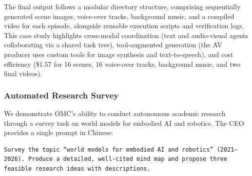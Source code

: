 \documentclass[11pt,a4paper]{article}
\begin{document}
The final output follows a modular directory structure, comprising sequentially generated scene images, voice-over tracks, background music, and a compiled video for each episode, alongside reusable execution scripts and verification logs. 
This case study highlights cross-modal coordination (text and audio-visual agents collaborating via a shared task tree), tool-augmented generation (the AV producer uses custom tools for image synthesis and text-to-speech), and cost efficiency (\$1.57 for 16 scenes, 16 voice-over tracks, background music, and two final videos).

\subsubsection{Automated Research Survey}

We demonstrate OMC's ability to conduct autonomous academic research through a survey task on world models for embodied AI and robotics.  The CEO provides a single prompt in Chinese:

\begin{mdframed}[
  nobreak=true,
  linewidth=0.8pt,
  linecolor=black!40,
  backgroundcolor=black!2,
  innertopmargin=10pt,
  innerbottommargin=10pt,
  innerleftmargin=14pt,
  innerrightmargin=14pt,
  roundcorner=4pt
]
\sloppy
\noindent\texttt{Survey the topic ``world models for embodied AI and robotics'' (2021--2026).  Produce a detailed, well-cited mind map and propose three feasible research ideas with descriptions.}
\end{mdframed}
\end{document}
